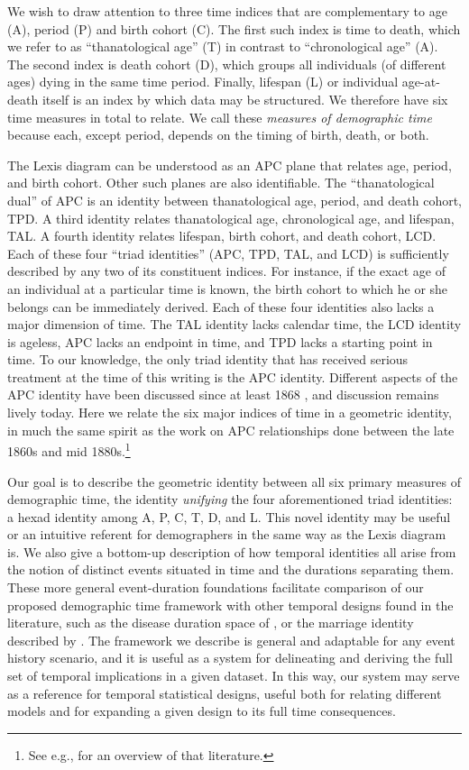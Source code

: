 \documentclass{bmcart}
\theoremstyle{definition}
\begin{document}
We wish to draw attention to three time indices that are complementary to age
(A), period (P) and birth cohort (C). The first such index is time to death,
which we refer to as ``thanatological age'' (T) in contrast to ``chronological
age'' (A). The second index is death cohort (D), which groups all individuals
(of different ages) dying in the same time period. Finally, lifespan (L) or
individual age-at-death itself is an index by which data may be structured.
We therefore have six time measures in total to relate. We call these \emph{measures of demographic
time} because each, except period, depends on the timing of birth, death, or
both.

The Lexis diagram can be understood as an APC plane
that relates age, period, and birth cohort. Other such planes are
also identifiable.
The ``thanatological dual'' of APC is an identity between thanatological
age, period, and death cohort, TPD. A third identity relates thanatological age,
chronological age, and lifespan, TAL. A fourth identity relates lifespan, birth
cohort, and death cohort, LCD. Each of these four ``triad identities'' (APC, TPD, TAL, and LCD) is sufficiently
described by any two of its constituent indices. For instance, if the exact age of an individual at a particular
time is known, the birth cohort to which he or she belongs can be immediately derived. Each of these four identities also lacks a major dimension of time. The TAL identity lacks calendar time, the LCD identity is ageless, APC lacks an endpoint in time, and TPD lacks a starting point in time.
To our knowledge, the only triad identity that has received serious
treatment at the time of this writing is the APC identity. Different
aspects of the APC identity have been discussed since at least 1868
\citep{knapp1868ermittlung}, and discussion remains lively today. Here we relate the six major indices of time in a geometric identity, in much the same spirit as the work on APC relationships done between the late
1860s and mid 1880s.\footnote{See e.g., \citet{keiding2011age} for an overview of that literature.} 


Our goal is to describe the geometric identity between all
six primary measures of demographic time, the identity \emph{unifying} the four
aforementioned triad identities: a hexad identity among A, P, C, T, D, and L.
This novel identity may be useful or an intuitive referent for demographers in
the same way as the Lexis diagram is. We also give a bottom-up description of
how temporal identities all arise from the notion of distinct events situated in time and the durations separating them. These more general event-duration foundations facilitate comparison of our proposed demographic time framework with other temporal designs found in the literature, such as the disease duration space of \citet{brinks2014lexis},
or the marriage identity described by \citet{lexis1875einleitung}.
The framework we describe is general and adaptable for any event history
scenario, and it is useful as a system for delineating and deriving the full
set of temporal implications in a given dataset. In this way, our system may
serve as a reference for temporal statistical designs, useful both for relating
different models and for expanding a given design to its full time
consequences. 
\end{document}
